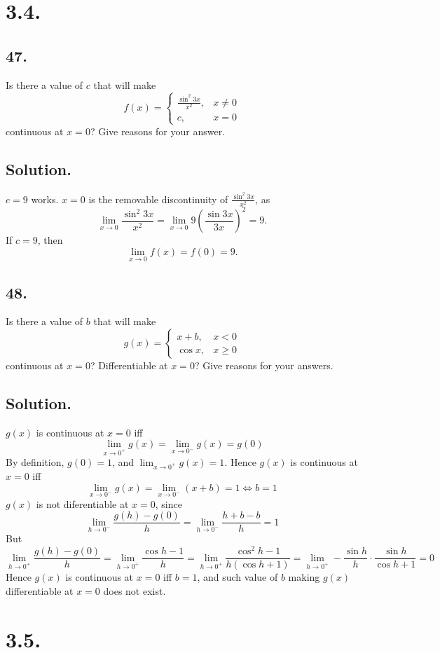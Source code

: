 \documentclass{article}
\begin{document}
\section*{3.4.}
\subsection*{47.}
Is there a value of $c$ that will make 
\[f(x)=\left\{\begin{array}{cc}
\frac{\sin^2{3x}}{x^2}, & x\neq 0 \\
c, & x=0
\end{array}\right.\]
continuous at $x=0$? Give reasons for your answer.
\subsection*{Solution.}
$c=9$ works.\newline
$x=0$ is the removable discontinuity of $\frac{\sin^2{3x}}{x^2}$, as
\[\lim _{x\to 0}\frac{\sin^2{3x}}{x^2}=\lim _{x\to 0}9\left(\frac{\sin{3x}}{3x}\right)^2=9.\]
If $c=9$, then 
\[\lim _{x\to 0} f(x)=f(0)=9.\]
\subsection*{48.}
Is there a value of $b$ that will make 
\[g(x)=\left\{\begin{array}{ll}
x+b, & x<0 \\
\cos{x}, & x \geq 0
\end{array}\right.\]
continuous at $x=0$? Differentiable at $x=0$? Give reasons for your answers.
\subsection*{Solution.}
$g(x)$ is continuous at $x=0$ iff
\[\lim _{x\to 0^+}g(x) =\lim _{x\to 0^-}g(x)=g(0)\]
By definition, $g(0)=1$, and $\lim _{x\to 0^+}g(x)=1$. Hence $g(x)$ is continuous at $x=0$ iff 
\[\lim _{x\to 0^-}g(x)=\lim _{x\to 0^-}(x+b)=1\Leftrightarrow b=1\]
$g(x)$ is not diferentiable at $x=0$, since
\[\lim _{h\to 0^-} \frac{g(h)-g(0)}{h}=\lim _{h\to 0^-}\frac{h+b-b}{h}=1\]
But
\[\lim _{h\to 0^+}\frac{g(h)-g(0)}{h}=\lim _{h\to 0^+}\frac{\cos{h}-1}{h}=\lim _{h\to 0^+}\frac{\cos^2{h}-1}{h(\cos{h}+1)}=\lim _{h\to 0^+}-\frac{\sin{h}}{h}\cdot\frac{\sin{h}}{\cos{h}+1}=0\]
Hence $g(x)$ is continuous at $x=0$ iff $b=1$, and such value of $b$ making $g(x)$ differentiable at $x=0$ does not exist.
\section*{3.5.}
\end{document}
